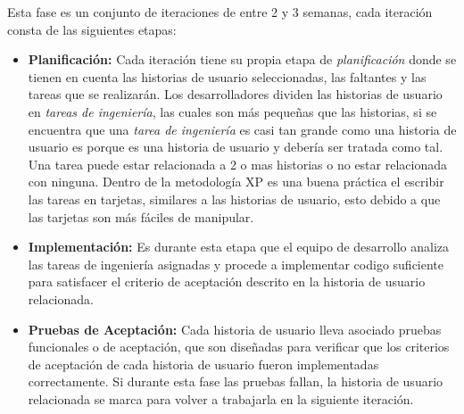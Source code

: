 
           Esta fase es un conjunto de iteraciones de entre 2 y 3 semanas, cada iteración consta de las siguientes etapas:

           \begin{itemize}
             \item \textbf{Planificación:} Cada iteración tiene su propia etapa de \emph{planificación} donde se tienen en cuenta las historias de usuario seleccionadas, las faltantes y las tareas que se realizarán.
             Los desarrolladores dividen las historias de usuario en \emph{tareas de ingeniería}, las cuales son más pequeñas que las historias, si se encuentra que una \emph{tarea de ingeniería} es casi tan grande como una historia de usuario es porque es una historia de usuario y debería ser tratada como tal.\\
             
             Una tarea puede estar relacionada a 2 o mas historias o no estar relacionada con ninguna. Dentro de la metodología XP es una buena práctica el escribir las tareas en tarjetas, similares a las historias de usuario, esto debido a que las tarjetas son más fáciles de manipular.

             \item \textbf{Implementación:} Es durante esta etapa que el equipo de desarrollo analiza las tareas de ingeniería asignadas y procede a implementar codigo suficiente para satisfacer el criterio de aceptación descrito en la historia de usuario relacionada.

             \item \textbf{Pruebas de Aceptación:} Cada historia de usuario lleva asociado pruebas funcionales o de aceptación, que son diseñadas para verificar que los criterios de aceptación de cada historia de usuario fueron implementadas correctamente. Si durante esta fase las pruebas fallan, la historia de usuario relacionada se marca para volver a trabajarla en la siguiente iteración.\\

           \end{itemize}

